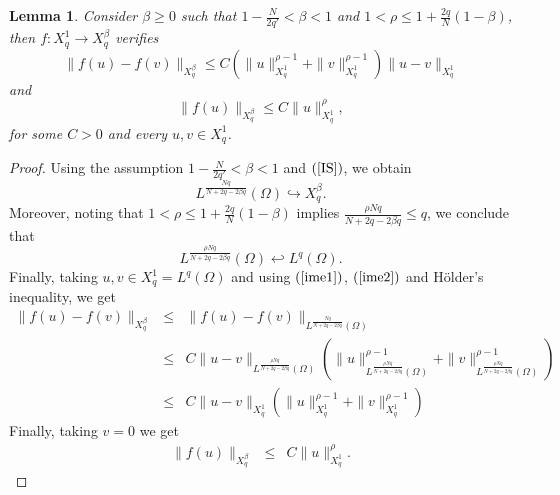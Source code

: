 \documentclass[12pt,reqno]{amsart}
\newtheorem{lema}{Lemma}
\begin{document}
			
\begin{lema}\label{lemaonda}
	Consider $\beta \ge 0$ such that $1-\frac{N}{2q'}<\beta<1$ and $1<\rho\leq 1+\frac{2q}{N}(1-\beta )$, then $f:X_{q}^{1}\to X_{q}^{\beta}$ verifies 
	\begin{equation*}
		\|f(u)-f(v)\|_{X_{q}^{\beta}}\leq C (\|u\|_{X_{q}^{1}}^{\rho-1}+\|v\|_{X_{q}^{1}}^{\rho-1})\|u-v\|_{X_{q}^{1}}
	\end{equation*} 
	and
	\begin{equation*}
		\|f(u)\|_{X_{q}^{\beta}}\leq C \|u\|_{X_{q}^{1}}^{\rho},
	\end{equation*} 
	for some $C>0$ and every $u,v\in X_{q}^{1}$.
\end{lema}
\begin{proof}
	Using the assumption $1-\frac{N}{2q'}<\beta<1$ and $(\ref{IS})$, we obtain 
	\begin{equation}\label{ime1}
		L^{\frac{Nq}{N+2q-2\beta q}}(\Omega)\hookrightarrow X_{q}^{\beta}.
	\end{equation}
	Moreover, noting that $1<\rho\leq 1+\frac{2q}{N}(1-\beta)$ implies
	$\frac{\rho Nq}{N+2q-2\beta q}\leq q$, we conclude that
	\begin{equation}\label{ime2}
		L^{\frac{\rho Nq}{N+2q-2\beta q}}(\Omega)\hookleftarrow L^q(\Omega).
	\end{equation}
	Finally, taking $u,v\in X_q^1=L^q(\Omega)$ and  using $(\ref{ime1})$, $(\ref{ime2})$ and H\"older's inequality, we get
	\begin{eqnarray*}
		\|f(u)-f(v)\|_{X_{q}^{\beta}} &\leq& \|f(u)-f(v)\|_{L^{\frac{Nq}{N+2q-2\beta q}}(\Omega)}\\
		&\leq & C\|u-v\|_{L^{\frac{\rho Nq}{N+2q-2\beta q}}(\Omega)}(\|u\|_{L^{\frac{\rho Nq}{N+2q-2\beta q}}(\Omega)}^{\rho-1}+\|v\|_{L^{\frac{\rho Nq}{N+2q-2\beta q}}(\Omega)}^{\rho-1})\\
		&\leq& C\|u-v\|_{X_{q}^{1}}(\|u\|_{X_{q}^{1}}^{\rho-1}+\|v\|_{X_{q}^{1}}^{\rho-1})
	\end{eqnarray*}
Finally, taking $v=0$  we get
	\begin{eqnarray*}
		\|f(u)\|_{X_{q}^{\beta}} &\leq&  C\|u\|_{X_{q}^{1}}^{\rho}.
	\end{eqnarray*}
\end{proof}
			
			
\end{document}
